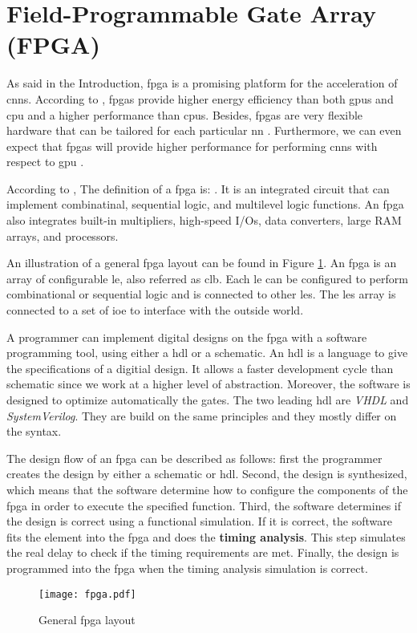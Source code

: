 \section{Field-Programmable Gate Array (FPGA)} \label{sec:fpga}
%
%
As said in the Introduction, \acrshort{fpga} is a promising platform for the acceleration of \acrshort{cnn}s. According to \textcite{mittal_survey_2014}, \acrshort{fpga}s provide higher energy efficiency than both \acrshort{gpu}s and \acrshort{cpu} and a higher performance than \acrshort{cpu}s. Besides, \acrshort{fpga}s are very flexible hardware that can be tailored for each particular \acrshort{nn} \cite{vestias_fast_2019}. Furthermore, we can even expect that \acrshort{fpga}s will provide higher performance for performing \acrshort{cnn}s with respect to \acrshort{gpu} \cite{nurvitadhi_can_2017}.

According to \textcite{harris_digital_2015}, The definition of a \acrshort{fpga} is: . It is an integrated circuit that can implement combinatinal, sequential logic, and multilevel logic functions. An \acrshort{fpga} also integrates built-in multipliers, high-speed I/Os, data converters, large RAM arrays, and processors.

An illustration of a general \acrshort{fpga} layout can be found in Figure \ref{fig:fpga}. An \acrshort{fpga} is an array of configurable \acrfull{le}, also referred as \acrfull{clb}. Each \acrshort{le} can be configured to perform combinational or sequential logic and is connected to other \acrshort{le}s. The \acrshort{le}s array is connected to a set of \acrfull{ioe} to interface with the outside world.

A programmer can implement digital designs on the \acrshort{fpga} with a software programming tool, using either a \acrfull{hdl} or a schematic. An \acrshort{hdl} is a language to give the specifications of a digitial design. It allows a faster development cycle than schematic since we work at a higher level of abstraction. Moreover, the software is designed to optimize automatically the gates. The two leading \acrshort{hdl} are \textit{VHDL} and \textit{SystemVerilog}. They are build on the same principles and they mostly differ on the syntax.

%
The design flow of an \acrshort{fpga} can be described as follows: first the programmer creates the design by either a schematic or \acrshort{hdl}. Second, the design is synthesized, which means that the software determine how to configure the components of the \acrshort{fpga} in order to execute the specified function. Third, the software determines if the design is correct using a functional simulation. If it is correct, the software fits the element into the \acrshort{fpga} and does the \textbf{timing analysis}. This step simulates the real delay to check if the timing requirements are met. Finally, the design is programmed into the \acrshort{fpga} when the timing analysis simulation is correct.
%
\begin{figure}[H]
    \centering
    \texttt{[image: fpga.pdf]}
    \caption{General \acrshort{fpga} layout \cite{harris_digital_2015}}
    \label{fig:fpga}
\end{figure}
